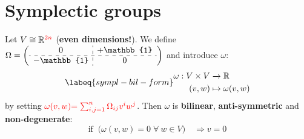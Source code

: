 \documentclass[../main.tex]{subfiles}
\begin{document}
\section{Symplectic groups}
Let $V\cong\mathbb{R}^{\color{red}2n}$ (\textbf{even dimensions!}). We define $\Omega=\left(\begin{array}{c:c}
    0 & +\mathbb{1} \\
    \hdashline
    -\mathbb{1} & 0
\end{array}\right)$ and introduce $\omega$:
\begin{equation}\labeq{sympl-bil-form}
\begin{split}
    \omega: V\times V &\xrightarrow[]{}\mathbb{R}\\
    (v,w) &\mapsto \omega(v,w)
    \end{split}
\end{equation}
by setting ${\color{red}\omega(v,w)}{\color{red}=\sum_{i,j=1}^n\Omega_{ij}v^iw^j}$. Then $\omega$ is \textbf{bilinear}, \textbf{anti-symmetric} and \textbf{non-degenerate}:
\[
\textrm{if }\ \Big(\omega(v,w)=0 \; \forall \ w \in V\Big)\quad \Rightarrow v=0
\]
\end{document}
